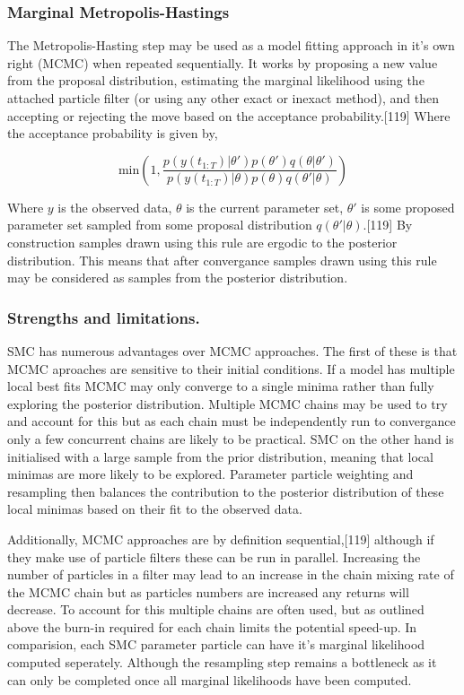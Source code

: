 \documentclass[11pt,twoside]{bristolthesis}
\begin{document}
  \hypertarget{marginal-metropolis-hastings}{%
  \subsubsection{Marginal Metropolis-Hastings}\label{marginal-metropolis-hastings}}
  
  The Metropolis-Hasting step may be used as a model fitting approach in it's own right (MCMC) when repeated sequentially. It works by proposing a new value from the proposal distribution, estimating the marginal likelihood using the attached particle filter (or using any other exact or inexact method), and then accepting or rejecting the move based on the acceptance probability.{[}119{]} Where the acceptance probability is given by,
  
  \[ \text{min} \left(1,  \frac{p(y(t_{1:T}) |\theta')p(\theta')q(\theta | \theta')}{p(y(t_{1:T}) |\theta)p(\theta)q(\theta' | \theta)}\right) \]
  
  Where \(y\) is the observed data, \(\theta\) is the current parameter set, \(\theta'\) is some proposed parameter set sampled from some proposal distribution \(q(\theta' | \theta)\).{[}119{]} By construction samples drawn using this rule are ergodic to the posterior distribution. This means that after convergance samples drawn using this rule may be considered as samples from the posterior distribution.
  
  \hypertarget{strengths-and-limitations.}{%
  \subsubsection{Strengths and limitations.}\label{strengths-and-limitations.}}
  
  SMC has numerous advantages over MCMC approaches. The first of these is that MCMC aproaches are sensitive to their initial conditions. If a model has multiple local best fits MCMC may only converge to a single minima rather than fully exploring the posterior distribution. Multiple MCMC chains may be used to try and account for this but as each chain must be independently run to convergance only a few concurrent chains are likely to be practical. SMC on the other hand is initialised with a large sample from the prior distribution, meaning that local minimas are more likely to be explored. Parameter particle weighting and resampling then balances the contribution to the posterior distribution of these local minimas based on their fit to the observed data.
  
  Additionally, MCMC approaches are by definition sequential,{[}119{]} although if they make use of particle filters these can be run in parallel. Increasing the number of particles in a filter may lead to an increase in the chain mixing rate of the MCMC chain but as particles numbers are increased any returns will decrease. To account for this multiple chains are often used, but as outlined above the burn-in required for each chain limits the potential speed-up. In comparision, each SMC parameter particle can have it's marginal likelihood computed seperately. Although the resampling step remains a bottleneck as it can only be completed once all marginal likelihoods have been computed.
  
\end{document}
